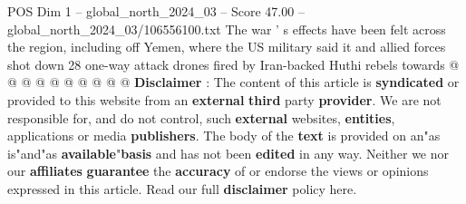 \begin{textsample}{POS Dim 1 – global\_north\_2024\_03 – Score 47.00 – global\_north\_2024\_03/106556100.txt}
The war ' s effects have been felt across the region, including off Yemen, where the US military said it and allied forces shot down 28 one-way attack drones fired by Iran-backed Huthi rebels towards @ @ @ @ @ @ @ @ @ @ \textbf{Disclaimer} : The content of this article is \textbf{syndicated} or provided to this website from an \textbf{external} \textbf{third} party \textbf{provider}.
We are not responsible for, and do not control, such \textbf{external} websites, \textbf{entities}, applications or media \textbf{publishers}.
The body of the \textbf{text} is provided on an"as is"and"as \textbf{available}"\textbf{basis} and has not been \textbf{edited} in any way.
Neither we nor our \textbf{affiliates} \textbf{guarantee} the \textbf{accuracy} of or endorse the views or opinions expressed in this article.
Read our full \textbf{disclaimer} policy here.

\end{textsample}
